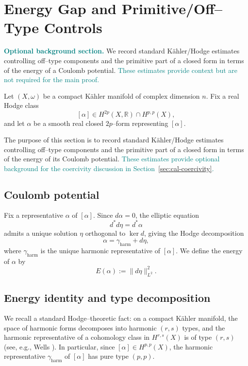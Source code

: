 \documentclass[11pt]{article}
\newcommand{\REVMZ}[1]{\textcolor{teal}{#1}}  %
\numberwithin{equation}{section}  %
\theoremstyle{plain}
\theoremstyle{definition}
\theoremstyle{remark}
\newcommand{\RR}{\mathbb{R}}
\newcommand{\harm}{\mathrm{harm}}
\begin{document}
\section{Energy Gap and Primitive/Off--Type Controls}
\label{sec:energy-gap}

\REVMZ{\textbf{Optional background section.}} We record standard K\"ahler/Hodge estimates \REVMZ{\cite{Wells,Voisin02,GH78}} controlling off--type components and the primitive part of a closed form in terms of the energy of a Coulomb potential. \REVMZ{These estimates provide context but are not required for the main proof.}

Let $(X,\omega)$ be a compact K\"ahler manifold of complex dimension $n$.
Fix a real Hodge class
\[
[\alpha]\in H^{2p}(X,\RR)\cap H^{p,p}(X),
\]
and let $\alpha$ be a smooth real closed $2p$--form representing $[\alpha]$.



The purpose of this section is to record standard K\"ahler/Hodge estimates controlling
off--type components and the primitive part of a closed form in terms of the energy of its Coulomb potential.
\REVMZ{These estimates provide optional background for the coercivity discussion in Section~\ref{sec:cal-coercivity}.}




\subsection*{Coulomb potential}
Fix a representative $\alpha$ of $[\alpha]$.  Since $d\alpha = 0$, the elliptic
equation
\[
d^{*}d\eta = d^{*}\alpha
\]
admits a unique solution $\eta$ orthogonal to $\ker d$, giving the Hodge
decomposition
\[
\alpha
= \gamma_{\harm} + d\eta,
\]
where $\gamma_{\harm}$ is the unique harmonic representative of $[\alpha]$.
We define the energy of $\alpha$ by
\[
E(\alpha) := \|d\eta\|^{2}_{L^{2}}.
\]


\subsection*{Energy identity and type decomposition}
We recall a standard Hodge--theoretic fact: on a compact K\"ahler manifold, the space of harmonic forms decomposes into harmonic \((r,s)\) types, and the harmonic representative of a cohomology class in \(H^{r,s}(X)\) is of type \((r,s)\) (see, e.g., Wells \cite[Ch.~5]{Wells}).
In particular, since \( [\alpha]\in H^{p,p}(X)\), the harmonic representative \(\gamma_{\harm}\) of \([\alpha]\) has pure type \((p,p)\).
\end{document}

